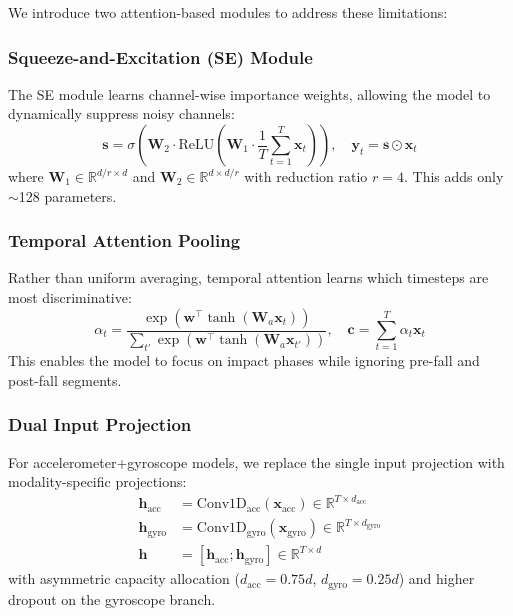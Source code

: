 We introduce two attention-based modules to address these limitations:

\subsubsection{Squeeze-and-Excitation (SE) Module}

The SE module learns channel-wise importance weights, allowing the model to dynamically suppress noisy channels:
\begin{equation}
    \mathbf{s} = \sigma\left(\mathbf{W}_2 \cdot \text{ReLU}\left(\mathbf{W}_1 \cdot \frac{1}{T}\sum_{t=1}^{T} \mathbf{x}_t\right)\right), \quad \mathbf{y}_t = \mathbf{s} \odot \mathbf{x}_t
\end{equation}
where $\mathbf{W}_1 \in \mathbb{R}^{d/r \times d}$ and $\mathbf{W}_2 \in \mathbb{R}^{d \times d/r}$ with reduction ratio $r=4$. This adds only $\sim$128 parameters.

\subsubsection{Temporal Attention Pooling}

Rather than uniform averaging, temporal attention learns which timesteps are most discriminative:
\begin{equation}
    \alpha_t = \frac{\exp(\mathbf{w}^\top \tanh(\mathbf{W}_a \mathbf{x}_t))}{\sum_{t'} \exp(\mathbf{w}^\top \tanh(\mathbf{W}_a \mathbf{x}_{t'}))}, \quad \mathbf{c} = \sum_{t=1}^{T} \alpha_t \mathbf{x}_t
\end{equation}
This enables the model to focus on impact phases while ignoring pre-fall and post-fall segments.

\subsubsection{Dual Input Projection}

For accelerometer+gyroscope models, we replace the single input projection with modality-specific projections:
\begin{align}
    \mathbf{h}_{\text{acc}} &= \text{Conv1D}_{\text{acc}}(\mathbf{x}_{\text{acc}}) \in \mathbb{R}^{T \times d_{\text{acc}}} \\
    \mathbf{h}_{\text{gyro}} &= \text{Conv1D}_{\text{gyro}}(\mathbf{x}_{\text{gyro}}) \in \mathbb{R}^{T \times d_{\text{gyro}}} \\
    \mathbf{h} &= [\mathbf{h}_{\text{acc}}; \mathbf{h}_{\text{gyro}}] \in \mathbb{R}^{T \times d}
\end{align}
with asymmetric capacity allocation ($d_{\text{acc}} = 0.75d$, $d_{\text{gyro}} = 0.25d$) and higher dropout on the gyroscope branch.

